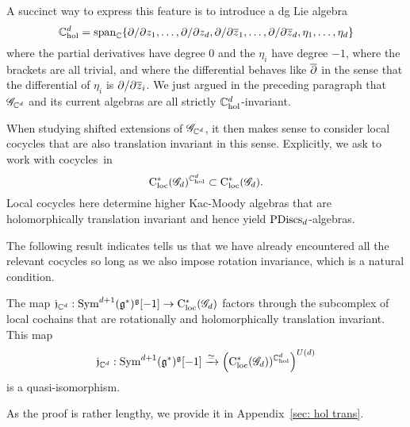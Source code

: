 A succinct way to express this feature is to introduce a dg Lie algebra  
\[
\CC^d_{\rm hol} = \text{span}_\CC\{\partial/\partial z_1, \ldots, \partial/\partial z_d, \partial/\partial \Bar{z}_1,\ldots,\partial/\partial \Bar{z}_d, \eta_1,\ldots, \eta_d\}
\]
where the partial derivatives have degree 0 and the $\eta_i$ have degree $-1$,
where the brackets are all trivial, 
and where the differential behaves like $\dbar$ in the sense that the differential of $\eta_i$ is $\partial/\partial \Bar{z}_i$.
We just argued in the preceding paragraph that $\sG_{\CC^d}$ and its current algebras are all strictly $\CC^d_{\rm hol}$-invariant. 

When studying shifted extensions of $\sG_{\CC^d}$, 
it then makes sense to consider local cocycles that are also translation invariant in this sense.
Explicitly, we ask to work with cocycles~in
\[
\cloc^*(\sG_{d})^{\CC^d_{\rm hol}} \subset \cloc^*(\sG_{d}).
\]
Local cocycles here determine higher Kac-Moody algebras that are holomorphically translation invariant and hence yield ${\rm PDiscs}_d$-algebras.

The following result indicates tells us that we have already encountered all the relevant cocycles so long as we also impose rotation invariance, which is a natural condition.

\begin{prop}
\label{prop: trans j}
The map $\fj_{\CC^d} :  \Sym^{d+1}(\fg^*)^\fg [-1] \to \cloc^*(\sG_{d})$ factors through the  subcomplex of local cochains that are rotationally and holomorphically translation invariant.
This map 
\[
\fj_{\CC^d} : \Sym^{d+1}(\fg^*)^\fg [-1] \xto{\simeq} \left(\cloc^*(\sG_d))^{\CC^{d}_{\rm hol}}\right)^{U(d)}
\]
is a quasi-isomorphism.
\end{prop}

As the proof is rather lengthy, we provide it in Appendix~\ref{sec: hol trans}.

